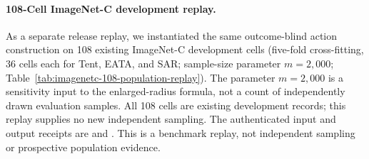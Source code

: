 \paragraph{108-Cell ImageNet-C development replay.}
As a separate release replay, we instantiated the same outcome-blind action construction
on 108 existing ImageNet-C development cells (five-fold cross-fitting, 36 cells each for
Tent, EATA, and SAR; sample-size parameter $m=2{,}000$; Table~\ref{tab:imagenetc-108-population-replay}).
The parameter $m=2{,}000$ is a sensitivity input to the enlarged-radius formula, not a count of independently drawn evaluation samples. All 108 cells are existing development records; this replay supplies no new independent sampling.
The authenticated input and output
receipts are 
 and
.
This is a benchmark replay, not independent sampling or prospective population evidence.

